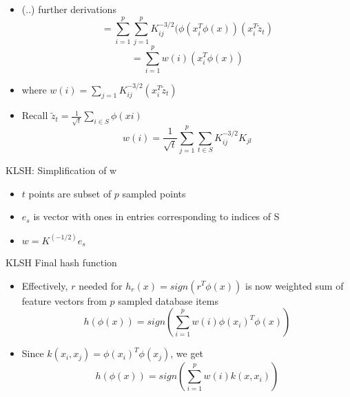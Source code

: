\documentclass[12pt,a4paper]{beamer}
\begin{document}
\begin{frame}
\begin{itemize}
\item (..) further derivations
$$ = \sum_{i=1}^{p}\sum_{j=1}^{p} K_{ij}^{-3/2}(\phi ( x_{i}^{T} \phi (x) ) (  x_{i}^{T} \tilde z_{t}  ) $$
$$ = \sum_{i=1}^{p} w(i) (  x_{i}^{T} \phi (x) ) $$
\item where $w(i) = \sum_{j=1} K_{ij}^{-3/2} (  x_{i}^{T} \tilde z_{t}) $
\item Recall $\tilde z_{t} = \frac{1} {\sqrt{t}} \sum_{i \in S}{\phi (xi)} $
$$w(i) = \frac{1}{\sqrt{t}}\sum_{j=1}^{p}\sum_{t \in S} K_{ij}^{-3/2} K_{jl} $$
\end{itemize}
\end{frame}





\begin{frame}{KLSH: Simplification of w }
\begin{itemize}
\item $t$ points are subset of $p$ sampled points
\item $e_s$ is vector with ones in entries corresponding to indices of S
\item $w = K^{(-1/2)} e_s$
\end{itemize}
\end{frame}



\begin{frame}{KLSH Final hash function}
\begin{itemize}
\item Effectively, $r$ needed for $h_r(x)=sign(r^T\phi(x))$ is now weighted sum of feature vectors from $p$ sampled database items
$$h(\phi(x)) = sign(\sum_{i=1}^{p}w(i)\phi(x_{i})^{T}\phi(x))$$
\item Since $k(x_i,x_j) = \phi(x_{i})^{T}\phi(x_{j}) $, we get
$$h(\phi(x)) = sign(\sum_{i=1}^{p}w(i)k(x,x_{i}))$$
\end{itemize}
\end{frame}
\end{document}

